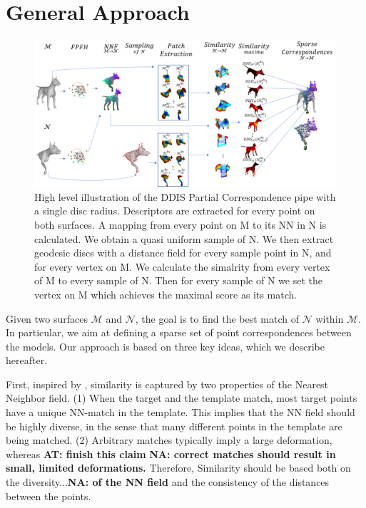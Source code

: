 \documentclass[10pt,twocolumn,letterpaper]{article}
\newcommand{\colornote}[3]{{\color{#1}\bf{#2: #3}\normalfont}}
\newcommand{\colornote}[3]{}
\newcommand {\ayellet}[1]{\colornote{blue}{AT}{#1}}
\newcommand {\nadav}[1]{\colornote{red}{NA}{#1}}
\begin{document}
\section{General Approach}
\label{sec:approach}
\begin{figure}[htb]
	\centering
	\includegraphics[width=1\textwidth]{figures/Birds_Flight.png}
	\caption{High level illustration of the DDIS Partial Correspondence pipe with a single disc radius. Descriptors are extracted for every point on both surfaces. A mapping from every point on M to its NN in N is calculated. We obtain a quasi uniform sample of N. We then extract geodesic discs with a distance field for every sample point in N, and for every vertex on M. We calculate the simalrity from every vertex of M to every sample of N. Then for every sample of N we set the vertex on M which achieves the maximal score as its match. }
\end{figure}

Given two surfaces $\mathcal{M}$ and $\mathcal{N}$, the goal is to find the best match of  $\mathcal{N}$ within  $\mathcal{M}$.
In particular, we aim at defining a sparse set of point correspondences between the models. 
Our approach is based on three key ideas, which we describe hereafter.

First, inspired by \cite{talmi2017template}, similarity is captured by two properties of the Nearest Neighbor field. 
(1) When the target and the template match, most target points have a unique NN-match in the template. 
This implies that the NN field should be highly diverse, in the sense that many different points in the template are being matched.
(2) Arbitrary matches typically imply a large deformation, whereas 
\ayellet{finish this claim} \nadav{correct matches should result in small, limited deformations.}
Therefore, Similarity should be based both on the diversity...\nadav{of the NN field} and the consistency of the distances between the points.
\end{document}
